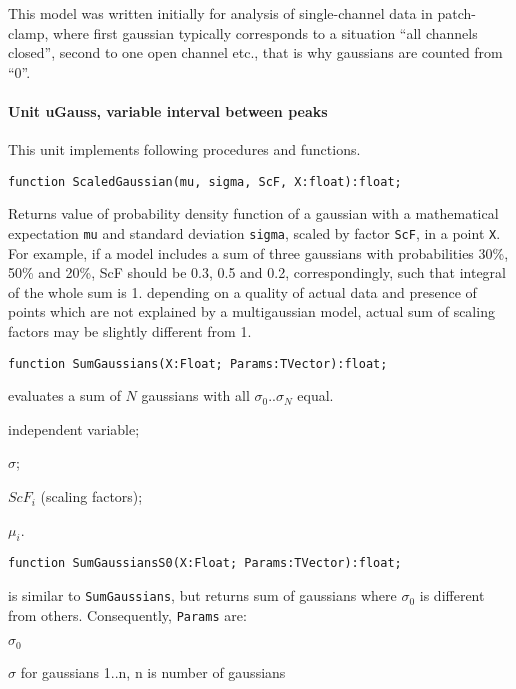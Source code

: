 \documentclass[12pt,a4paper,oneside]{article}
\newcommand{\code}[1]{\texttt{#1}}
\begin{document}
This model was written initially for analysis of single-channel data in patch-clamp, where first gaussian typically corresponds to a situation ``all channels closed'', second to one open channel etc., that is why gaussians are counted from ``0''.  
\paragraph*{Unit uGauss, variable interval between peaks}
This unit implements following procedures and functions.
\begin{verbatim}
function ScaledGaussian(mu, sigma, ScF, X:float):float;
\end{verbatim}
Returns value of probability density function of a gaussian with a mathematical expectation \code{mu} and standard deviation \code{sigma}, scaled by factor \code{ScF}, in a point \code{X}. For example, if a model includes a sum of three gaussians with probabilities 30\%, 50\% and 20\%, ScF should be 0.3, 0.5 and 0.2, correspondingly, such that integral of the whole sum is 1. depending on a quality of actual data and presence of points which are not explained by a multigaussian model, actual sum of scaling factors may be slightly different from 1.
\begin{verbatim}
function SumGaussians(X:Float; Params:TVector):float;
\end{verbatim}\vspace{-6pt}
evaluates a sum of $N$ gaussians with all $\sigma_0..\sigma_N$ equal.
\begin{description}[noitemsep]
\item[X] independent variable;
\item[Params{[1]}] $\sigma$;
\item[{Params[2]..Params[NumberOfGaussians+1]}] $ScF_i$ (scaling factors);
\item[{Params[NumberOfGaussians+2..2*NumberOfGaussians+2]}] $\mu_i$.
\end{description}
\begin{verbatim}
function SumGaussiansS0(X:Float; Params:TVector):float;
\end{verbatim}\vspace{-6pt}
is similar to \code{SumGaussians}, but returns sum of gaussians where $\sigma_0$ is different from others. Consequently, \code{Params} are:
\begin{description}[noitemsep]
\item[Params{[1]}] $\sigma_0$
\item[Params{[2]}] $\sigma$	for gaussians 1..n, n is number of gaussians
\item[]
\end{description}
\end{document}
